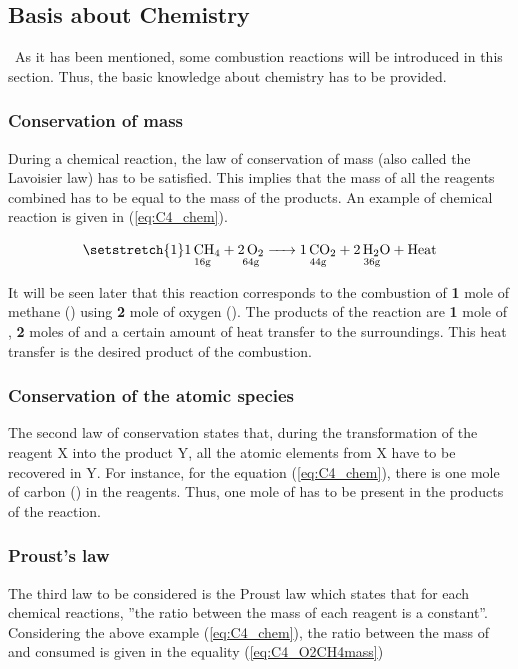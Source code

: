 \subsection{Basis about Chemistry}
\quad\ As it has been mentioned, some combustion reactions will be introduced in this section. Thus, the basic knowledge about chemistry has to be provided.

\subsubsection{Conservation of mass}
During a chemical reaction, the law of conservation of mass (also called the Lavoisier law) has to be satisfied. This implies that the mass of all the reagents combined has to be equal to the mass of the products. An example of chemical reaction is given in (\ref{eq:C4_chem}).

\begin{equation}
    \setstretch{1}
    \underset{\mathrm{16g}}{\ce{1CH4}} \ce{+} \underset{\mathrm{64g}}{\ce{2O2}} \ce{->} \underset{\mathrm{44g}}{\ce{1CO2}} \ce{+} \underset{\mathrm{36g}}{\ce{2H2O}} \ce{+}\text{Heat}\label{eq:C4_chem}
\end{equation}

It will be seen later that this reaction corresponds to the combustion of \textbf{1} mole of methane () using \textbf{2} mole of oxygen (). The products of the reaction are \textbf{1} mole of , \textbf{2} moles of  and a certain amount of heat transfer to the surroundings. This heat transfer is the desired product of the combustion.

\subsubsection{Conservation of the atomic species}
The second law of conservation states that, during the transformation of the reagent X into the product Y, all the atomic elements from X have to be recovered in Y. For instance, for the equation (\ref{eq:C4_chem}), there is one mole of carbon () in the reagents. Thus, one mole of  has to be present in the products of the reaction.
\newpage
\subsubsection{Proust's law}
The third law to be considered is the Proust law which states that for each chemical reactions, ''the ratio between the mass of each reagent is a constant''. Considering the above example (\ref{eq:C4_chem}), the ratio between the mass of  and  consumed is given in the equality (\ref{eq:C4_O2CH4mass})

